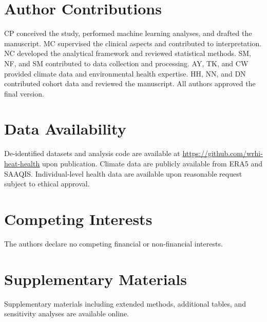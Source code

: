 \documentclass[11pt,a4paper]{article}
\begin{document}
\section*{Author Contributions}

CP conceived the study, performed machine learning analyses, and drafted the manuscript. MC supervised the clinical aspects and contributed to interpretation. NC developed the analytical framework and reviewed statistical methods. SM, NF, and SM contributed to data collection and processing. AY, TK, and CW provided climate data and environmental health expertise. HH, NN, and DN contributed cohort data and reviewed the manuscript. All authors approved the final version.

\section*{Data Availability}

De-identified datasets and analysis code are available at \url{https://github.com/wrhi-heat-health} upon publication. Climate data are publicly available from ERA5 and SAAQIS. Individual-level health data are available upon reasonable request subject to ethical approval.

\section*{Competing Interests}

The authors declare no competing financial or non-financial interests.

\section*{Supplementary Materials}

Supplementary materials including extended methods, additional tables, and sensitivity analyses are available online.



\end{document}
